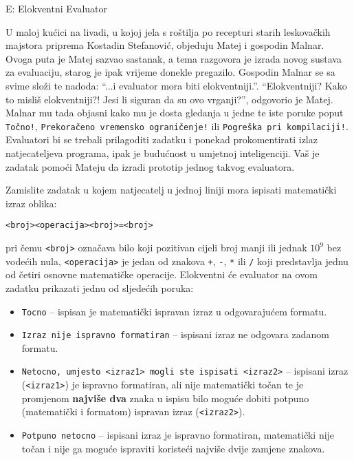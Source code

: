 \begin{statement}[
  timelimit=1 s,
  memorylimit=512 MiB,
]{E: Elokventni Evaluator}

U maloj kućici na livadi, u kojoj jela s roštilja po recepturi starih
leskovačkih majstora priprema Kostadin Stefanović, objeduju Matej i gospodin
Malnar. Ovoga puta je Matej sazvao sastanak, a tema razgovora je izrada novog
sustava za evaluaciju, starog je ipak vrijeme donekle pregazilo.
Gospodin Malnar se sa svime složi te nadoda: ``...i evaluator mora biti
elokventniji.''. ``Elokventniji? Kako to misliš elokventniji?! Jesi li siguran
da su ovo vrganji?'', odgovorio je Matej. Malnar mu tada objasni kako mu je
dosta gledanja u jedne te iste poruke poput \texttt{Točno!},
\texttt{Prekoračeno vremensko ograničenje!} ili \texttt{Pogreška pri kompilaciji!}.
Evaluatori bi se trebali prilagoditi zadatku i ponekad prokomentirati izlaz
natjecateljeva programa, ipak je budućnost u umjetnoj inteligenciji. Vaš je
zadatak pomoći Mateju da izradi prototip jednog takvog evaluatora.

Zamislite zadatak u kojem natjecatelj u jednoj liniji mora ispisati matematički
izraz oblika:
\begin{center}
\texttt{<broj><operacija><broj>=<broj>}
\end{center}
pri čemu \texttt{<broj>}
označava bilo koji pozitivan cijeli broj manji ili jednak $10^9$ bez vodećih nula,
\texttt{<operacija>} je jedan od znakova \texttt{+}, \texttt{-}, \texttt{*} ili
\texttt{/} koji predstavlja jednu od četiri osnovne matematičke operacije.
Elokventni će evaluator na ovom zadatku prikazati jednu od sljedećih poruka:

\begin{itemize}
  \item \texttt{Tocno} -- ispisan je matematički ispravan izraz u odgovarajućem formatu.
  \item \texttt{Izraz nije ispravno formatiran} -- ispisani izraz ne odgovara zadanom formatu.
  \item \texttt{Netocno, umjesto <izraz1> mogli ste ispisati <izraz2>} --
    ispisani izraz (\texttt{<izraz1>}) je ispravno formatiran, ali nije
    matematički točan te je promjenom \textbf{najviše dva} znaka u ispisu bilo
    moguće dobiti potpuno (matematički i formatom) ispravan izraz (\texttt{<izraz2>}).
  \item \texttt{Potpuno netocno} -- ispisani izraz je ispravno formatiran,
    matematički nije točan i nije ga moguće ispraviti koristeći najviše dvije
    zamjene znakova.
\end{itemize}

\end{statement}
